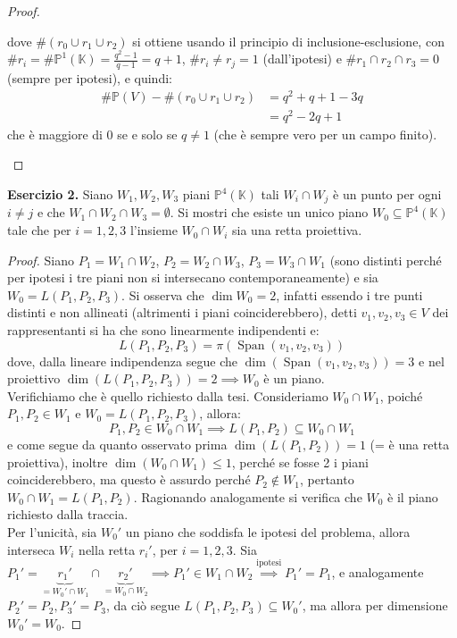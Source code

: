 \documentclass[12pt]{article}
\theoremstyle{remark}
\theoremstyle{definition}
\newenvironment{solution}{\renewcommand{\proofname}{Soluzione}\begin{proof}}{\end{proof}}
\newcommand{\PP}{\mathbb{P}}
\newcommand{\KK}{\mathbb{K}}
\DeclareMathOperator{\Span}{Span}
\begin{document}
\begin{solution}
\begin{enumerate}[(1)]
\[      \]
    dove $\#(r_0 \cup r_1 \cup r_2)$ si ottiene usando il principio di inclusione-esclusione, con $\#r_i = \#\PP^1(\KK) = \frac{q^2-1}{q-1} = q+1$, $\# r_i \ne r_j = 1$ (dall'ipotesi) e $\# r_1 \cap r_2 \cap r_3 = 0$ (sempre per ipotesi), e quindi:
    \[ \begin{split}
      \#\PP(V) - \#(r_0 \cup r_1 \cup r_2) & = q^2 + q + 1 - 3q \\
                                           & = q^2 - 2q + 1
    \end{split}
      \]
    che è maggiore di 0 se e solo se $q \ne 1$ (che è sempre vero per un campo finito).
    \end{enumerate}
\end{solution}

\noindent \textbf{Esercizio 2.} Siano $W_1,W_2,W_3$ piani $\PP^4(\KK)$ tali $W_i \cap W_j$ è un punto per ogni $i \ne j$ e che $W_1 \cap W_2 \cap W_3 = \emptyset$. Si mostri che esiste un unico piano $W_0 \subseteq \PP^4(\KK)$ tale che per 
$i = 1,2,3$ l'insieme $W_0 \cap W_i$ sia una retta proiettiva.

\begin{solution}
  Siano $P_1 = W_1 \cap W_2$, $P_2 = W_2 \cap W_3$, $P_3 = W_3 \cap W_1$ (sono distinti perché per ipotesi i tre piani non si intersecano contemporaneamente) e sia $W_0 = L(P_1,P_2,P_3)$. Si osserva che $\dim W_0 = 2$, infatti essendo i tre punti distinti e non allineati (altrimenti i piani coinciderebbero), detti $v_1,v_2,v_3 \in V$
  dei rappresentanti si ha che sono linearmente indipendenti e:
  \[ L(P_1,P_2,P_3) = \pi(\Span(v_1,v_2,v_3))
    \] 
  dove, dalla lineare indipendenza segue che $\dim(\Span(v_1,v_2,v_3)) = 3$ e nel proiettivo $\dim(L(P_1,P_2,P_3)) = 2 \implies W_0$ è un piano.\\
  Verifichiamo che è quello richiesto dalla tesi. Consideriamo $W_0 \cap W_1$, poiché $P_1,P_2 \in W_1$ e $W_0 = L(P_1,P_2,P_3)$, allora:
  \[ P_1,P_2 \in W_0 \cap W_1 \implies L(P_1,P_2) \subseteq W_0 \cap W_1
    \]
  e come segue da quanto osservato prima $\dim(L(P_1,P_2)) = 1$ (= è una retta proiettiva), inoltre $\dim(W_0 \cap W_1) \leq 1$, perché se fosse 2 i piani coinciderebbero, ma questo è assurdo perché $P_2 \not \in W_1$, pertanto $W_0 \cap W_1 = L(P_1,P_2)$. Ragionando analogamente si verifica che $W_0$ è il piano richiesto dalla traccia.\\
  Per l'unicità, sia $W_0'$ un piano che soddisfa le ipotesi del problema, allora interseca $W_i$ nella retta $r_i'$, per $i = 1,2,3$. Sia $P_1' = \underbrace{r_1 '}_{ = W_0' \cap W_1} \cap \underbrace{r_2 '}_{= W_0 \cap W_2} \implies P_1' \in W_1 \cap W_2 \overset{\text{ipotesi}}{\implies} P_1' = P_1$, e analogamente $P_2' = P_2, P_3' = P_3$, da ciò segue $L(P_1,P_2,P_3) \subseteq W_0'$, ma allora per dimensione $W_0' = W_0$.
\end{solution}
\end{document}
